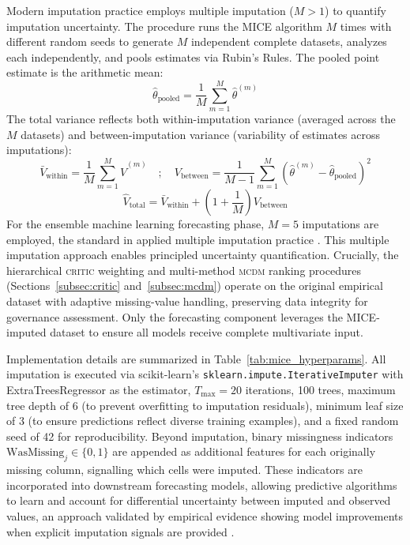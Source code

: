 \documentclass[12pt,a4paper]{article}
\newcommand{\MCDM}{\textsc{mcdm}\xspace}
\newcommand{\CRITIC}{\textsc{critic}\xspace}
\begin{document}
Modern imputation practice employs multiple imputation ($M > 1$) to quantify imputation uncertainty. The procedure runs the MICE algorithm $M$ times with different random seeds to generate $M$ independent complete datasets, analyzes each independently, and pools estimates via Rubin's Rules. The pooled point estimate is the arithmetic mean:
\begin{equation}
\label{eq:rubin_point}
\hat{\theta}_{\text{pooled}} = \frac{1}{M} \sum_{m=1}^{M} \hat{\theta}^{(m)}
\end{equation}
The total variance reflects both within-imputation variance (averaged across the $M$ datasets) and between-imputation variance (variability of estimates across imputations):
\begin{equation}
\label{eq:rubin_within}
\bar{V}_{\text{within}} = \frac{1}{M} \sum_{m=1}^{M} \hat{V}^{(m)} \quad ; \quad V_{\text{between}} = \frac{1}{M-1} \sum_{m=1}^{M} \left(\hat{\theta}^{(m)} - \hat{\theta}_{\text{pooled}}\right)^2
\end{equation}
\begin{equation}
\label{eq:rubin_total}
\hat{V}_{\text{total}} = \bar{V}_{\text{within}} + \left(1 + \frac{1}{M}\right) V_{\text{between}}
\end{equation}
For the ensemble machine learning forecasting phase, $M = 5$ imputations are employed, the standard in applied multiple imputation practice \citep{vanBuuren2018}. This multiple imputation approach enables principled uncertainty quantification. Crucially, the hierarchical \CRITIC weighting and multi-method \MCDM ranking procedures (Sections~\ref{subsec:critic} and~\ref{subsec:mcdm}) operate on the original empirical dataset with adaptive missing-value handling, preserving data integrity for governance assessment. Only the forecasting component leverages the MICE-imputed dataset to ensure all models receive complete multivariate input.

Implementation details are summarized in Table~\ref{tab:mice_hyperparams}. All imputation is executed via scikit-learn's \texttt{sklearn.impute.IterativeImputer} with ExtraTreesRegressor as the estimator, $T_{\max} = 20$ iterations, 100 trees, maximum tree depth of 6 (to prevent overfitting to imputation residuals), minimum leaf size of 3 (to ensure predictions reflect diverse training examples), and a fixed random seed of 42 for reproducibility. Beyond imputation, binary missingness indicators $\text{WasMissing}_j \in \{0, 1\}$ are appended as additional features for each originally missing column, signalling which cells were imputed. These indicators are incorporated into downstream forecasting models, allowing predictive algorithms to learn and account for differential uncertainty between imputed and observed values, an approach validated by empirical evidence showing model improvements when explicit imputation signals are provided \citep{vanBuuren2018}.
\end{document}
